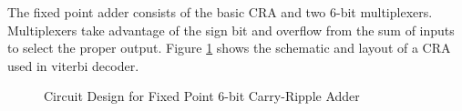 \documentclass[conference]{IEEEtran}
\begin{document}
The fixed point adder consists of the basic CRA and two 6-bit multiplexers. Multiplexers take advantage of the sign bit and overflow from the sum of inputs to select the proper output. Figure \ref{fig:cradder6} shows the schematic and layout of a CRA used in viterbi decoder.
\begin{figure}[h]
\centerline{
\hfil
{}}
\caption{Circuit Design for Fixed Point 6-bit Carry-Ripple Adder}
\label{fig:cradder6}
\end{figure}
\end{document}

